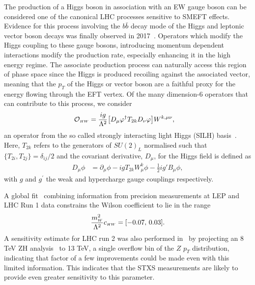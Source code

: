 The production of a Higgs boson in association with an EW gauge boson can be considered one of the canonical LHC processes sensitive to SMEFT effects. Evidence for this process involving the $b\bar{b}$ decay mode of the Higgs and leptonic vector boson decays was finally observed in 2017~\cite{Aaboud:2017xsd,Sirunyan:2017elk}. Operators which modify the Higgs coupling to these gauge bosons, introducing momentum dependent interactions modify the production rate, especially enhancing it in the high energy regime. The associate production process can naturally access this region of phase space since the Higgs is produced recoiling against the associated vector, meaning that the $p_T$ of the Higgs or vector boson are a faithful proxy for the energy flowing through the EFT vertex. Of the many dimension-6 operators that can contribute to this process, we consider 
\begin{align}
    \mathcal{O}_{\scriptscriptstyle HW} &= 
    \frac{ig}{\Lambda^2} \big[D_\mu \varphi^\dag T_{2k} D_\nu \varphi\big] 
    W^{k,\mu \nu},
\end{align}
an operator from the so called strongly interacting light Higgs (SILH) basis~\cite{Giudice:2007fh,Contino:2013kra}. Here, $T_{2k}$ refers to the generators of $SU(2)_L$ normalised such that $\{T_{2i},T_{2j}\}=\delta_{ij}/2$ and the covariant derivative, $D_\mu$, for the Higgs field is defined as
\begin{align}
    D_\mu\phi &= \partial_\mu \phi -  i g T_{2k} W_\mu^k \phi - \frac12 i g' B_\mu \phi,
\end{align}
with $g$ and $g^\prime$ the weak and hypercharge gauge couplings respectively.

A global fit~\cite{Ellis:2014jta} combining information from precision measurements at LEP and LHC Run 1 data constrains the Wilson coefficient to lie in the range 
\begin{align}
    \frac{m_{\scriptscriptstyle W}^2}{\Lambda^2}c_{\scriptscriptstyle HW} = [-0.07,\,0.03].
\end{align}
A sensitivity estimate for LHC run 2 was also performed in~\cite{Degrande:2016dqg} by projecting an 8 TeV ZH analysis~\cite{TheATLAScollaboration:2013lia} to 13 TeV, a single overflow bin of the $Z$ $p_T$ distribution, indicating that factor of a few improvements could be made even with this limited information. This indicates that the STXS measurements are likely to provide even greater sensitivity to this parameter.


